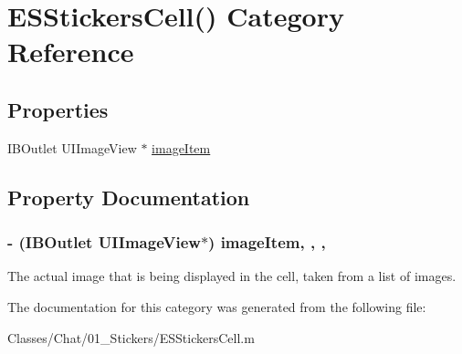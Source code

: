 \hypertarget{category_e_s_stickers_cell_07_08}{}\section{E\+S\+Stickers\+Cell() Category Reference}
\label{category_e_s_stickers_cell_07_08}
\subsection*{Properties}
\begin{DoxyCompactItemize}
\item 
I\+B\+Outlet U\+I\+Image\+View $\ast$ \hyperlink{category_e_s_stickers_cell_07_08_a9ab5b0dc1775c6ba258a5f1af752cfe2}{image\+Item}
\end{DoxyCompactItemize}


\subsection{Property Documentation}
\hypertarget{category_e_s_stickers_cell_07_08_a9ab5b0dc1775c6ba258a5f1af752cfe2}{}
\subsubsection[{image\+Item}]{\setlength{\rightskip}{0pt plus 5cm}-\/ (I\+B\+Outlet U\+I\+Image\+View$\ast$) image\+Item\hspace{0.3cm}{\ttfamily [read]}, {\ttfamily [write]}, {\ttfamily [nonatomic]}, {\ttfamily [strong]}}\label{category_e_s_stickers_cell_07_08_a9ab5b0dc1775c6ba258a5f1af752cfe2}
The actual image that is being displayed in the cell, taken from a list of images. 

The documentation for this category was generated from the following file\+:\begin{DoxyCompactItemize}
\item 
Classes/\+Chat/01\+\_\+\+Stickers/E\+S\+Stickers\+Cell.\+m\end{DoxyCompactItemize}
